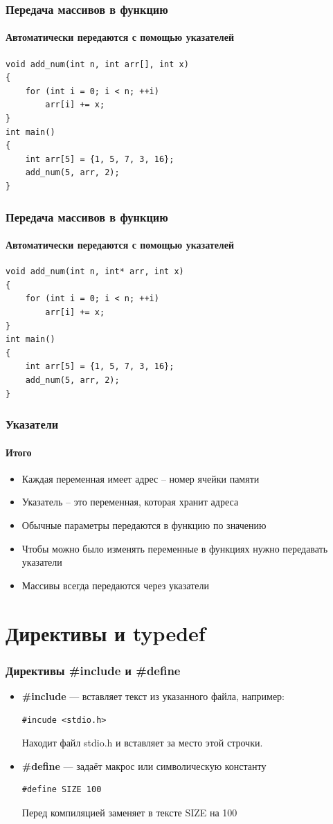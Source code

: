 \documentclass[12pt,pdf,hyperref={unicode}]{beamer}
\begin{document}
\begin{frame}[fragile]
\frametitle{Передача массивов в функцию}
\framesubtitle{Автоматически передаются с помощью указателей}
\begin{lstlisting}
void add_num(int n, int arr[], int x)
{
    for (int i = 0; i < n; ++i)
        arr[i] += x;
}
int main()
{
    int arr[5] = {1, 5, 7, 3, 16};
    add_num(5, arr, 2);
}
\end{lstlisting}
\end{frame}

\begin{frame}[fragile]
\frametitle{Передача массивов в функцию}
\framesubtitle{Автоматически передаются с помощью указателей}
\begin{lstlisting}
void add_num(int n, int* arr, int x)
{
    for (int i = 0; i < n; ++i)
        arr[i] += x;
}
int main()
{
    int arr[5] = {1, 5, 7, 3, 16};
    add_num(5, arr, 2);
}
\end{lstlisting}
\end{frame}


\begin{frame}[fragile]
\frametitle{Указатели}
\framesubtitle{Итого}
\begin{itemize}
\item Каждая переменная имеет адрес -- номер ячейки памяти
\item Указатель -- это переменная, которая хранит адреса
\item Обычные параметры передаются в функцию по значению
\item Чтобы можно было изменять переменные в функциях нужно передавать указатели
\item Массивы всегда передаются через указатели
\end{itemize}
\end{frame}


\section{Директивы и typedef}
\begin{frame}[fragile]
\frametitle{Директивы \#include и \#define} 
\begin{center}
\begin{itemize}
\item \textbf{\#include} — вставляет текст из указанного файла, например:
\begin{verbatim}
#incude <stdio.h>
\end{verbatim}
Находит файл stdio.h и вставляет за место этой строчки.
\item \textbf{\#define} — задаёт макрос или символическую константу
\begin{verbatim}
#define SIZE 100
\end{verbatim}
Перед компиляцией заменяет в тексте SIZE на 100
\end{itemize}
\end{center}
\end{frame}
\end{document}

